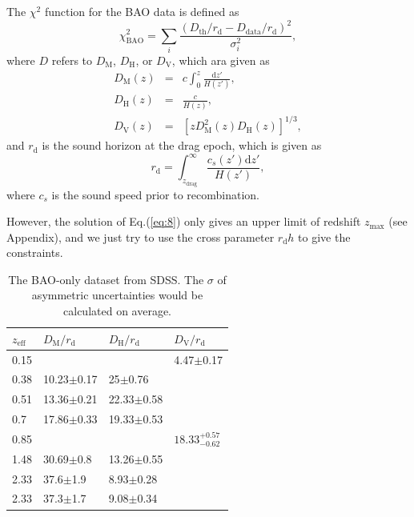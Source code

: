 \documentclass[twocolumn]{aastex631}
\begin{document}
   The $\chi^2$ function for the BAO data is defined as
   \begin{equation}
      \chi_{\text{BAO}}^2=\sum_i\frac{(D_{\text{th}}/r_{\text{d}}-D_{\text{data}}/r_{\text{d}})^2}{\sigma_i^2},
   \end{equation}
   where $D$ refers to $D_{\text{M}}$, $D_{\text{H}}$, or $D_{\text{V}}$, which ara given as
   \begin{eqnarray}
      D_{\text{M}}(z)&=&c\int_0^z\frac{\text{d}z'}{H(z')},\\
      D_{\text{H}}(z)&=&\frac{c}{H(z)},\\
      D_{\text{V}}(z)&=&\left[zD_{\text{M}}^2(z)D_{\text{H}}(z)\right]^{1/3},
   \end{eqnarray}
   and $r_{\text{d}}$ is the sound horizon at the drag epoch, which is given as
   \begin{equation}
      r_{\text{d}}=\int_{z_{\text{drag}}}^{\infty}\frac{c_s(z')\text{d}z'}{H(z')},
   \end{equation}
   where $c_s$ is the sound speed prior to recombination.

   However, the solution of Eq.(\ref{eq:8}) only gives an upper limit of redshift $z_{\max}$
   (see Appendix), and we just try to use the cross
   parameter $r_{\text{d}}h$ to give the constraints.

   \begin{table}[htbp]
      \centering
      \begin{tabular}{llll}
         \hline\hline
         $z_{\text{eff}}$ & $D_{\text{M}}/r_{\text{d}}$ & 
         $D_{\text{H}}/r_{\text{d}}$ & $D_{\text{V}}/r_{\text{d}}$ \\
         \hline
         0.15 & & & 4.47$\pm$0.17 \\
         0.38 & 10.23$\pm$0.17 & 25$\pm$0.76 & \\
         0.51 & 13.36$\pm$0.21 & 22.33$\pm$0.58 & \\
         0.7 & 17.86$\pm$0.33 & 19.33$\pm$0.53 & \\
         0.85 & & & $18.33_{-0.62}^{+0.57}$ \\
         1.48 & 30.69$\pm$0.8 & 13.26$\pm$0.55 & \\
         2.33 & 37.6$\pm$1.9 & 8.93$\pm$0.28 & \\
         2.33 & 37.3$\pm$1.7 & 9.08$\pm$0.34 & \\
         \hline
      \end{tabular}
      \caption{The BAO-only dataset from SDSS. The $\sigma$ of asymmetric 
      uncertainties would be calculated on average.}
      \label{tab:2}
   \end{table}
\end{document}
